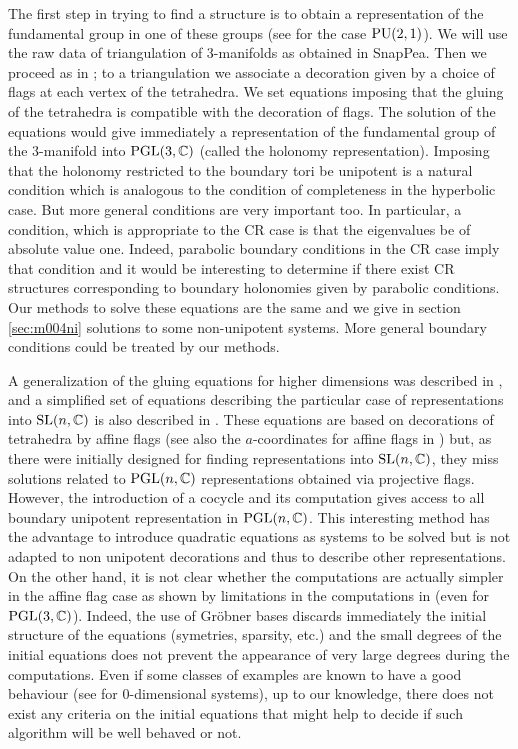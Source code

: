 The first step in trying to find a structure is to obtain a representation of the fundamental group in one of these groups (see \cite{falbeleight} for the case $\textrm{PU}(2,1)$).   We will use the raw data of triangulation of 3-manifolds as obtained in SnapPea.  Then we proceed as in \cite{BFG}; to a triangulation we associate a decoration
given by a choice of flags at each vertex of the tetrahedra.  We set equations imposing that the gluing of the tetrahedra is compatible with the decoration of flags.  The solution of the equations would give immediately a representation of the fundamental group of the 3-manifold into $\textrm{PGL}(3,\mathbb{C})$ (called the holonomy representation).  Imposing that the holonomy restricted to the boundary tori be unipotent is a natural condition which is analogous to the condition of completeness in the hyperbolic case.  But more general conditions are very important too.  In particular, a condition, which is appropriate to the CR case is that the eigenvalues be of absolute value one.
Indeed, parabolic boundary conditions in the CR case imply that condition and it would be interesting to determine if there exist CR structures corresponding to  boundary holonomies given by parabolic
 conditions. Our methods to solve these equations are the same and we give in  section \ref{sec:m004ni}  solutions to some  non-unipotent
systems.  More general boundary conditions could be treated by our methods.


A generalization of the gluing equations for higher dimensions was described in \cite{GGZ}, and a simplified set of equations describing the particular case of representations into $\textrm{SL}(n,\mathbb{C})$ is also described in \cite{GTZ1}.
These equations are based on decorations of tetrahedra by affine flags (see also the $a$-coordinates for affine flags  in \cite{BFG}) but, as there were initially designed for finding representations into $\textrm{SL}(n,\mathbb{C})$, they miss solutions related to  $\textrm{PGL}(n,\mathbb{C})$ representations obtained via projective flags. However, the introduction of a cocycle and its computation gives access to all boundary unipotent representation in $\textrm{PGL}(n,\mathbb{C})$.  This interesting method has the advantage to
introduce quadratic equations as systems to be solved but is not adapted to non unipotent decorations and thus to describe other representations.
On the other hand, it is not clear whether the computations are actually simpler in the affine flag case as shown by limitations in the computations in \cite{Ptolemy} (even for $\textrm{PGL}(3,\mathbb{C})$).  Indeed, the use of Gröbner bases discards immediately the initial structure of the equations (symetries, sparsity, etc.) and the small degrees of the initial equations does not prevent the appearance of very large degrees during the computations. Even if some classes of examples are known to have a good behaviour (see \cite{HL2011} for $0$-dimensional systems), up to our knowledge, there does not exist any criteria on the initial equations that might help to decide if such algorithm will be well behaved or not.

